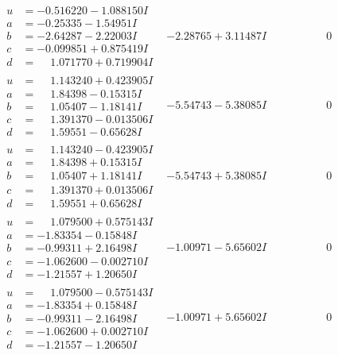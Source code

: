\documentclass[1p]{elsarticle_modified}
\theoremstyle{definition}
\begin{document}
$$\begin{array}{c|c|c}
\begin{aligned}
u &= -0.516220 - 1.088150 I \\
a &= -0.25335 - 1.54951 I \\
b &= -2.64287 - 2.22003 I \\
c &= -0.099851 + 0.875419 I \\
d &= \phantom{-}1.071770 + 0.719904 I\end{aligned}
 & -2.28765 + 3.11487 I & \phantom{-0.000000 } 0 \\ \hline\begin{aligned}
u &= \phantom{-}1.143240 + 0.423905 I \\
a &= \phantom{-}1.84398 - 0.15315 I \\
b &= \phantom{-}1.05407 - 1.18141 I \\
c &= \phantom{-}1.391370 - 0.013506 I \\
d &= \phantom{-}1.59551 - 0.65628 I\end{aligned}
 & -5.54743 - 5.38085 I & \phantom{-0.000000 } 0 \\ \hline\begin{aligned}
u &= \phantom{-}1.143240 - 0.423905 I \\
a &= \phantom{-}1.84398 + 0.15315 I \\
b &= \phantom{-}1.05407 + 1.18141 I \\
c &= \phantom{-}1.391370 + 0.013506 I \\
d &= \phantom{-}1.59551 + 0.65628 I\end{aligned}
 & -5.54743 + 5.38085 I & \phantom{-0.000000 } 0 \\ \hline\begin{aligned}
u &= \phantom{-}1.079500 + 0.575143 I \\
a &= -1.83354 - 0.15848 I \\
b &= -0.99311 + 2.16498 I \\
c &= -1.062600 - 0.002710 I \\
d &= -1.21557 + 1.20650 I\end{aligned}
 & -1.00971 - 5.65602 I & \phantom{-0.000000 } 0 \\ \hline\begin{aligned}
u &= \phantom{-}1.079500 - 0.575143 I \\
a &= -1.83354 + 0.15848 I \\
b &= -0.99311 - 2.16498 I \\
c &= -1.062600 + 0.002710 I \\
d &= -1.21557 - 1.20650 I\end{aligned}
 & -1.00971 + 5.65602 I & \phantom{-0.000000 } 0\\

\end{array}$$
\end{document}
